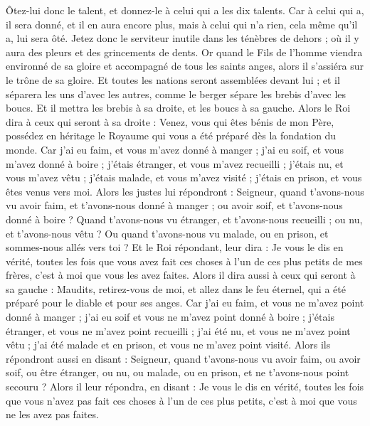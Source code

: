 \begin{multicols}{2}
Ôtez-lui donc le talent, et donnez-le à celui qui a les dix talents.
Car à celui qui a, il sera donné, et il en aura encore plus, mais à celui qui n’a rien, cela même qu’il a, lui sera ôté.
Jetez donc le serviteur inutile dans les ténèbres de dehors ; où il y aura des pleurs et des grincements de dents.
Or quand le Fils de l'homme viendra environné de sa gloire et accompagné de tous les saints anges, alors il s’assiéra sur le trône de sa gloire.
Et toutes les nations seront assemblées devant lui ; et il séparera les uns d'avec les autres, comme le berger sépare les brebis d'avec les boucs.
Et il mettra les brebis à sa droite, et les boucs à sa gauche.
Alors le Roi dira à ceux qui seront à sa droite : Venez, vous qui êtes bénis de mon Père, possédez en héritage le Royaume qui vous a été préparé dès la fondation du monde.
Car j'ai eu faim, et vous m'avez donné à manger ; j'ai eu soif, et vous m'avez donné à boire ; j'étais étranger, et vous m'avez recueilli ;
j'étais nu, et vous m'avez vêtu ; j'étais malade, et vous m'avez visité ; j'étais en prison, et vous êtes venus vers moi.
Alors les justes lui répondront : Seigneur, quand t'avons-nous vu avoir faim, et t'avons-nous donné à manger ; ou avoir soif, et t'avons-nous donné à boire ?
Quand t'avons-nous vu étranger, et t'avons-nous recueilli ; ou nu, et t'avons-nous vêtu ?
Ou quand t'avons-nous vu malade, ou en prison, et sommes-nous allés vers toi ?
Et le Roi répondant, leur dira : Je vous le dis en vérité, toutes les fois que vous avez fait ces choses à l'un de ces plus petits de mes frères, c’est à moi que vous les avez faites.
Alors il dira aussi à ceux qui seront à sa gauche : Maudits, retirez-vous de moi, et allez dans le feu éternel, qui a été préparé pour le diable et pour ses anges.
Car j'ai eu faim, et vous ne m'avez point donné à manger ; j'ai eu soif et vous ne m'avez point donné à boire ;
j'étais étranger, et vous ne m'avez point recueilli ; j'ai été nu, et vous ne m'avez point vêtu ; j'ai été malade et en prison, et vous ne m'avez point visité.
Alors ils répondront aussi en disant : Seigneur, quand t’avons-nous vu avoir faim, ou avoir soif, ou être étranger, ou nu, ou malade, ou en prison, et ne t'avons-nous point secouru ?
Alors il leur répondra, en disant : Je vous le dis en vérité, toutes les fois que vous n'avez pas fait ces choses à l'un de ces plus petits, c’est à moi que vous ne les avez pas faites.

\end{multicols}
